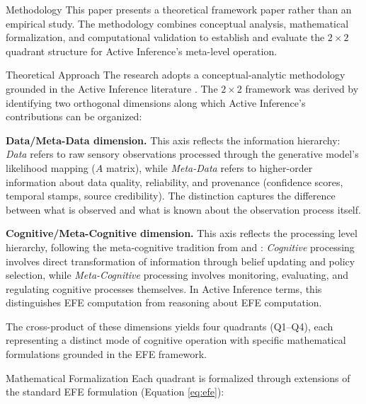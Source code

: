 \documentclass[
  ignorenonframetext,
]{beamer}
\author{\texorpdfstring{}{}}
\date{}
\begin{document}
\begin{frame}[fragile]{Methodology}
\protect{}\label{sec:methodology}
This paper presents a theoretical framework paper rather than an
empirical study. The methodology combines conceptual analysis,
mathematical formalization, and computational validation to establish
and evaluate the \(2 \times 2\) quadrant structure for Active
Inference's meta-level operation.

\begin{block}{Theoretical Approach}
\protect{}\label{theoretical-approach}
The research adopts a conceptual-analytic methodology grounded in the
Active Inference literature \cite{friston2010free, parr2022active}. The
\(2 \times 2\) framework was derived by identifying two orthogonal
dimensions along which Active Inference's contributions can be
organized:

\textbf{Data/Meta-Data dimension.} This axis reflects the information
hierarchy: \emph{Data} refers to raw sensory observations processed
through the generative model's likelihood mapping (\(A\) matrix), while
\emph{Meta-Data} refers to higher-order information about data quality,
reliability, and provenance (confidence scores, temporal stamps, source
credibility). The distinction captures the difference between what is
observed and what is known about the observation process itself.

\textbf{Cognitive/Meta-Cognitive dimension.} This axis reflects the
processing level hierarchy, following the meta-cognitive tradition from
\cite{flavell1979metacognition} and \cite{nelson1990metamemory}:
\emph{Cognitive} processing involves direct transformation of
information through belief updating and policy selection, while
\emph{Meta-Cognitive} processing involves monitoring, evaluating, and
regulating cognitive processes themselves. In Active Inference terms,
this distinguishes EFE computation from reasoning about EFE computation.

The cross-product of these dimensions yields four quadrants (Q1--Q4),
each representing a distinct mode of cognitive operation with specific
mathematical formulations grounded in the EFE framework.
\end{block}

\begin{block}{Mathematical Formalization}
\protect{}\label{mathematical-formalization}
Each quadrant is formalized through extensions of the standard EFE
formulation (Equation \eqref{eq:efe}):


\end{block}
\end{frame}
\end{document}
